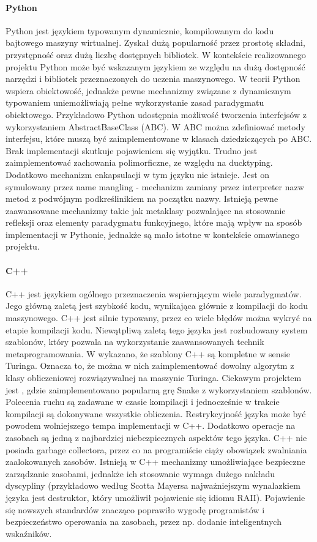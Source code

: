 \documentclass[12pt]{article}
\begin{document}
\paragraph{Python}
Python jest językiem typowanym dynamicznie, kompilowanym do kodu bajtowego maszyny wirtualnej. Zyskał dużą popularność przez prostotę składni, przystępność oraz dużą liczbę dostępnych bibliotek. W kontekście realizowanego projektu Python może być wskazanym językiem ze względu na dużą dostępność narzędzi i bibliotek przeznaczonych do uczenia maszynowego. W teorii Python wspiera obiektowość, jednakże pewne mechanizmy związane z dynamicznym typowaniem uniemożliwiają pełne wykorzystanie zasad paradygmatu obiektowego. Przykładowo Python udostępnia możliwość tworzenia interfejsów z wykorzystaniem AbstractBaseClass (ABC). W ABC można zdefiniować metody interfejsu, które muszą być zaimplementowane w klasach dziedziczących po ABC. Brak implementacji skutkuje pojawieniem się wyjątku. Trudno jest zaimplementować zachowania polimorficzne, ze względu na ducktyping. Dodatkowo mechanizm enkapsulacji w tym języku nie istnieje. Jest on symulowany przez name mangling - mechanizm zamiany przez interpreter nazw metod z podwójnym podkreślinikiem na początku nazwy. Istnieją pewne zaawansowane mechanizmy takie jak metaklasy pozwalające na stosowanie refleksji oraz elementy paradygmatu funkcyjnego, które mają wpływ na sposób implementacji w Pythonie, jednakże są mało istotne w kontekście omawianego projektu.

\paragraph{C++}
C++ jest językiem ogólnego przeznaczenia wspierającym wiele paradygmatów. Jego główną zaletą jest szybkość kodu, wynikająca głównie z kompilacji do kodu maszynowego. C++ jest silnie typowany, przez co wiele błędów można wykryć na etapie kompilacji kodu. Niewątpliwą zaletą tego języka jest rozbudowany system szablonów, który pozwala na wykorzystanie zaawansowanych technik metaprogramowania. W \cite{Cpp_turing_complete} wykazano, że szablony C++ są kompletne w sensie Turinga. Oznacza to, że można w nich zaimplementować dowolny algorytm z klasy obliczeniowej rozwiązywalnej na maszynie Turinga. Ciekawym projektem jest \cite{Cpp_snake_compile_time}, gdzie zaimplementowano popularną grę Snake z wykorzystaniem szablonów. Polecenia ruchu są zadawane w czasie kompilacji i jednocześnie w trakcie kompilacji są dokonywane wszystkie obliczenia. Restrykcyjność języka może być powodem wolniejszego tempa implementacji w C++. Dodatkowo operacje na zasobach są jedną z najbardziej niebezpiecznych aspektów tego języka. C++ nie posiada garbage collectora, przez co na programiście ciąży obowiązek zwalniania zaalokowanych zasobów. Istnieją w C++ mechanizmy umożliwiające bezpieczne zarządzanie zasobami, jednakże ich stosowanie wymaga dużego nakładu dyscypliny (przykładowo według Scotta Mayersa najważniejszym wynalazkiem języka jest destruktor, który umożliwił pojawienie się idiomu RAII). Pojawienie się nowszych standardów znacząco poprawiło wygodę programistów i bezpieczeństwo operowania na zasobach, przez np. dodanie inteligentnych wskaźników.
\end{document}
